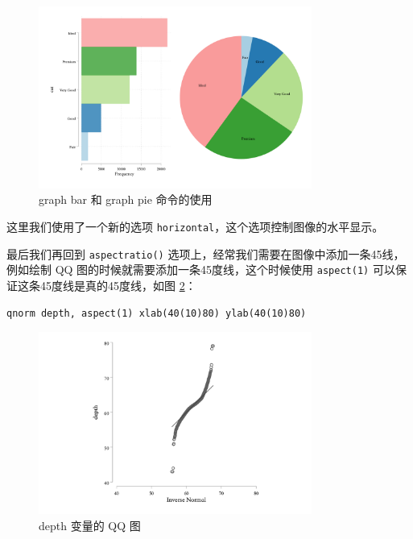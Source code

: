 \documentclass[]{ctexbook}
\begin{document}
\begin{figure}

{\centering \includegraphics[width=0.8\textwidth]{assets/barpluspie} 

}

\caption{graph bar 和 graph pie 命令的使用}\label{fig:barpluspie}
\end{figure}

这里我们使用了一个新的选项 \texttt{horizontal}，这个选项控制图像的水平显示。

最后我们再回到 \texttt{aspectratio()} 选项上，经常我们需要在图像中添加一条45线，例如绘制 QQ 图的时候就需要添加一条45度线，这个时候使用 \texttt{aspect(1)} 可以保证这条45度线是真的45度线，如图 \ref{fig:qnorm}：

\begin{lstlisting}
qnorm depth, aspect(1) xlab(40(10)80) ylab(40(10)80)
\end{lstlisting}

\begin{figure}

{\centering \includegraphics[width=0.8\textwidth]{assets/qnorm} 

}

\caption{depth 变量的 QQ 图}\label{fig:qnorm}
\end{figure}
\end{document}
